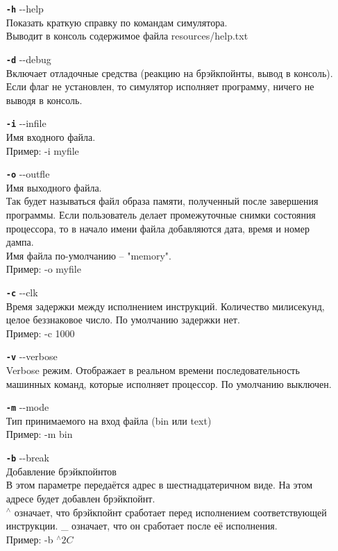 \begin{enumerate}
	\item[{\tt\bf -h}] {-}-help \\
	Показать краткую справку по командам симулятора. \\
	Выводит в консоль содержимое файла resources/help.txt
	
	\item[{\tt\bf -d}] {-}-debug \\
	Включает отладочные средства (реакцию на брэйкпойнты, вывод в консоль).
	Если флаг не  установлен, то симулятор исполняет программу, ничего не выводя в консоль.
	
	\item[{\tt\bf -i}] {-}-infile \\
	Имя входного файла. \\
	Пример: -i myfile
	
	\item[{\tt\bf -o}] {-}-outfle \\
	Имя выходного файла. \\ 
	Так будет называться файл образа памяти, полученный после завершения программы. Если пользователь делает промежуточные снимки состояния процессора, то в начало имени файла добавляются дата, время и номер дампа.\\
	Имя файла по-умолчанию -- "memory".\\
	Пример: -o myfile
	
	\item[{\tt\bf -c}] {-}-clk \\
	Время задержки между исполнением инструкций. Количество милисекунд, целое беззнаковое число. По умолчанию задержки нет.\\
	Пример: -c 1000
	
	\item[{\tt\bf -v}] {-}-verbose \\
	Verbose режим. Отображает в реальном времени последовательность машинных команд, которые исполняет процессор. По умолчанию выключен.
	
	\item[{\tt\bf -m}] {-}-mode \\
	Тип принимаемого на вход файла (bin или text) \\
	Пример: -m bin
	
	\item[{\tt\bf -b}] {-}-break \\
	Добавление брэйкпойнтов \\
	В этом параметре передаётся адрес в шестнадцатеричном виде. На этом адресе будет добавлен брэйкпойнт. \\
	$^\wedge$ означает, что брэйкпойнт сработает перед исполнением соответствующей инструкции. \_ означает, что он сработает после её исполнения. \\
	Пример: -b $^\wedge2C$
	

\end{enumerate}
